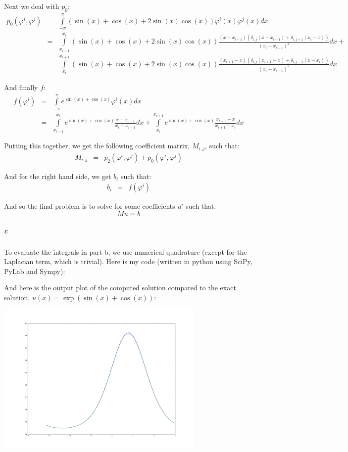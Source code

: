 \documentclass{article}
\begin{document}
Next we deal with $p_0$:
\begin{eqnarray*}
p_0(\varphi^i, \varphi^j) & = & \int \limits_{-\pi}^{\pi} \left( \sin(x) + \cos(x) + 2 \sin(x) \cos(x) \right) \varphi^i(x) \varphi^j(x) dx\\
 & = & 
\int \limits_{x_{i-1}}^{x_i} \left( \sin(x) + \cos(x) + 2 \sin(x) \cos(x) \right) \frac{ (x - x_{i-1}) (\delta_{i,j} (x - x_{i-1}) + \delta_{i,j+1}(x_i - x)) }{\left(x_{i} - x_{i-1}\right)^2} dx + \\
& & \int \limits_{x_{i}}^{x_{i+1}} \left( \sin(x) + \cos(x) + 2 \sin(x) \cos(x) \right) \frac{ (x_{i+1} - x) (\delta_{i,j} (x_{i+1} - x) + \delta_{i,j-1}(x - x_i))}{\left(x_{i} - x_{i+1}\right)^2} dx
\end{eqnarray*}

And finally $f$:
\begin{eqnarray*}
f(\varphi^i) & = & \int \limits_{-\pi}^{\pi} e^{\sin(x) + \cos(x)} \varphi^i(x) dx \\
& = & \int \limits_{x_{i-1}}^{x_i} e^{\sin(x) + \cos(x)} \frac{x - x_{i-1}}{x_{i} - x_{i-1}} dx + \int \limits_{x_{i}}^{x_{i+1}} e^{\sin(x) + \cos(x)} \frac{x_{i+1} - x}{x_{i+1} - x_{i}} dx
\end{eqnarray*}

Putting this together, we get the following coefficient matrix, $M_{i,j}$, such that:
\begin{eqnarray*}
M_{i,j} & = & p_2(\varphi^i, \varphi^j) + p_0(\varphi^i, \varphi^j)
\end{eqnarray*}

And for the right hand side, we get $b_i$ such that:
\begin{eqnarray*}
b_i & = & f(\varphi^i)
\end{eqnarray*}

And so the final problem is to solve for some coefficients $u^i$ such that:
\[ M u = b \]

\subparagraph{c}

To evaluate the integrals in part b, we use numerical quadrature (except for the Laplacian term, which is trivial).  Here is my code (written in python using SciPy, PyLab and Sympy):

\pagebreak


And here is the output plot of the computed solution compared to the exact solution, $u(x) = \exp( \sin(x) + \cos(x) )$:

\begin{center}
\includegraphics[width=4in]{prob1_result.png}
\end{center}
\end{document}
